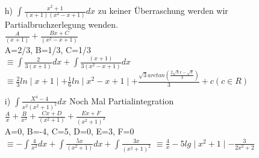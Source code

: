 \documentclass{standalone}
\begin{document}
\begin{itemize}
	\item[h)]$\int\frac{x^2+1}{(x+1)(x^2-x+1)}dx$ zu keiner Überraschung werden wir Partialbruchzerlegung wenden.\\
			$\frac{A}{(x+1)}+\frac{Bx+C}{(x^2-x+1)}$\\
			A=2/3, B=1/3, C=1/3\\
			$\equiv \int\frac{2}{3(x+1)}dx+\int\frac{(x+1)}{3(x^2-x+1)}dx$
			$\equiv \frac{2}{3}ln\mid x+1\mid+\frac{1}{6}ln\mid x^2-x+1\mid + \frac{\sqrt{3}arctan(\frac{2\sqrt{3}x-\sqrt{3}}{3})}{3}+c (c \in R)$
			
	\item[i)]$\int \frac{X^4-4}{x^2(x^2+1)^2}dx$ Noch Mal Partialintegration\\
		     $ \frac{A}{x}+\frac{B}{x^2}+\frac{Cx+D}{(x^2+1)}+\frac{Ex+F}{(x^2+1)^2}$\\
		     A=0, B=-4, C=5, D=0, E=3, F=0\\
		     $\equiv -\int\frac{4}{x^2}dx +\int \frac{5x}{(x^2+1)}dx + \int \frac{3x}{(x^2+1)^2} $
		     $\equiv \frac{4}{x}-5lg \mid x^2+1\mid-\frac{3}{2x^2+2}$
			 
\end{itemize}
\end{document}
